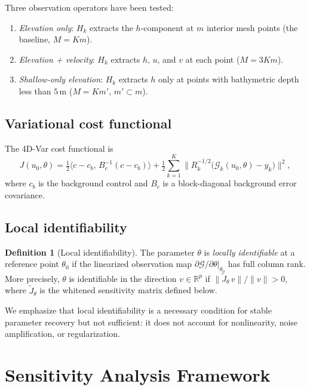 \documentclass[11pt]{article}
\theoremstyle{definition}
\newtheorem{definition}{Definition}
\begin{document}
Three observation operators have been tested:
\begin{enumerate}
\item \emph{Elevation only}: $H_k$ extracts the $h$-component at
  $m$ interior mesh points (the baseline, $M = Km$).
\item \emph{Elevation + velocity}: $H_k$ extracts $h$, $u$, and $v$
  at each point ($M = 3Km$).
\item \emph{Shallow-only elevation}: $H_k$ extracts $h$ only at
  points with bathymetric depth less than $5\,$m ($M = Km'$,
  $m' \subset m$).
\end{enumerate}

\subsection{Variational cost functional}

The 4D-Var cost functional is
\begin{equation}\label{eq:cost}
J(u_0, \theta)
= \tfrac{1}{2}\langle c - c_b,\, B_c^{-1}(c - c_b)\rangle
+ \tfrac{1}{2}\sum_{k=1}^{K}
  \bigl\|R_k^{-1/2}\bigl(\mathcal{G}_k(u_0,\theta) - y_k\bigr)\bigr\|^2,
\end{equation}
where $c_b$ is the background control and $B_c$ is a block-diagonal
background error covariance.

\subsection{Local identifiability}

\begin{definition}[Local identifiability]
The parameter $\theta$ is \emph{locally identifiable} at a reference
point $\theta_0$ if the linearized observation map
$\partial\mathcal{G}/\partial\theta\big|_{\theta_0}$ has full column
rank.  More precisely, $\theta$ is identifiable in the direction
$v \in \mathbb{R}^p$ if
$\|\widetilde{J}_\theta\, v\| / \|v\| > 0$, where
$\widetilde{J}_\theta$ is the whitened sensitivity matrix defined
below.
\end{definition}

We emphasize that local identifiability is a necessary condition for
stable parameter recovery but not sufficient: it does not account for
nonlinearity, noise amplification, or regularization.

\section{Sensitivity Analysis Framework}
\label{sec:sensitivity}
\end{document}
